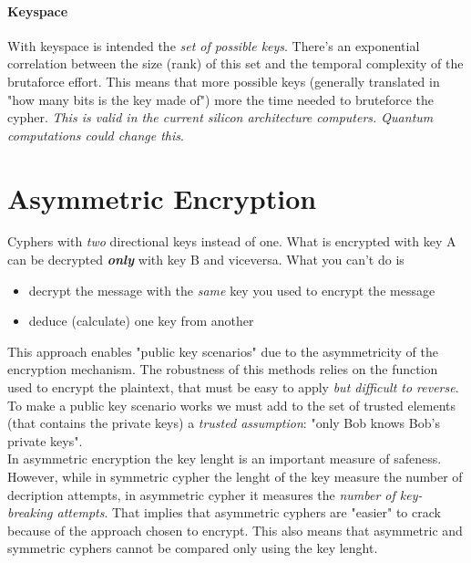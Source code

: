 \documentclass{article}
\begin{document}
				\paragraph{Keyspace}
					With keyspace is intended the \emph{set of possible keys}. There's an exponential correlation between the size (rank) of this set and the temporal complexity of the brutaforce effort. This means that more possible keys (generally translated in "how many bits is the key made of") more the time needed to bruteforce the cypher. \emph{This is valid in the current silicon architecture computers. Quantum computations could change this}.
		
		\section{Asymmetric Encryption}
			Cyphers with \emph{two} directional keys instead of one. What is encrypted with key A can be decrypted \emph{\textbf{only}} with key B and viceversa. What you can't do is
			\begin{itemize}
				\item decrypt the message with the \emph{same} key you used to encrypt the message
				\item deduce (calculate) one key from another
			\end{itemize}
			This approach enables "public key scenarios" due to the asymmetricity of the encryption mechanism. The robustness of this methods relies on the function used to encrypt the plaintext, that must be easy to apply \emph{but difficult to reverse}.\\
			To make a public key scenario works we must add to the set of trusted elements (that contains the private keys) a \emph{trusted assumption}: "only Bob knows Bob's private keys".\\
			In asymmetric encryption the key lenght is an important measure of safeness. However, while in symmetric cypher the lenght of the key measure the number of decription attempts, in asymmetric cypher it measures the \emph{number of key-breaking attempts}. That implies that asymmetric cyphers are "easier" to crack because of the approach chosen to encrypt. This also means that asymmetric and symmetric cyphers cannot be compared only using the key lenght.
			
\end{document}
